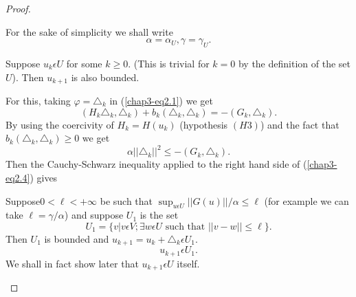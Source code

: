 \begin{proof}
\begin{step}
For the sake of simplicity we shall write
$$
\alpha = \alpha_{U}, \gamma = \gamma_{U}.
$$
\end{step}

\begin{step}%
 Suppose $u_{k} \epsilon U$ for some $k \geq 0$. (This is trivial for $k = 0$ by the definition of the set $U$). Then $u_{k+1}$ is also bounded.

For this, taking $\varphi = \triangle_{k}$ in (\ref{chap3-eq2.1}) we get
\begin{equation*}
(H_{k} \triangle_{k}, \triangle_{k}) + b_{k} (\triangle_{k}, \triangle_{k}) = -(G_{k}, \triangle_{k}).\tag{2.3}\label{chap3-eq2.3}
\end{equation*}
By using the coercivity of $H_{k} = H(u_{k})$ (hypothesis $(H3)$) and the fact that $b_{k} (\triangle_{k}, \triangle_{k}) \geq 0$ we get
\begin{equation*}
\alpha ||\triangle_{k}||^{2} \leq -(G_{k}, \triangle_{k}).\tag{2.4}\label{chap3-eq2.4}
\end{equation*}
Then the Cauchy-Schwarz inequality applied to the right hand side of (\ref{chap3-eq2.4}) gives

Suppose\pageoriginale $0 < \ell < + \infty$ be such that $\sup_{u \epsilon U} ||G(u)|| / \alpha \leq \ell$ (for example we can take $\ell = \gamma / \alpha$) and suppose $U_{1}$ is the set
\begin{equation*}
U_{1} = \{v | v\epsilon V; \exists w \epsilon U \text{ such that }
||v-w|| \leq \ell\}. \tag{2.5}\label{chap3-eq2.5}
\end{equation*}
Then $U_{1}$ is bounded and $u_{k+1} = u_{k} + \triangle_{k} \epsilon U_{1}$.
\begin{equation*}
u_{k+1} \epsilon U_{1}.\tag{2.6}\label{chap3-eq2.6}
\end{equation*}
We shall in fact show later that $u_{k+1} \epsilon U$ itself.
\end{step}


\end{proof}
